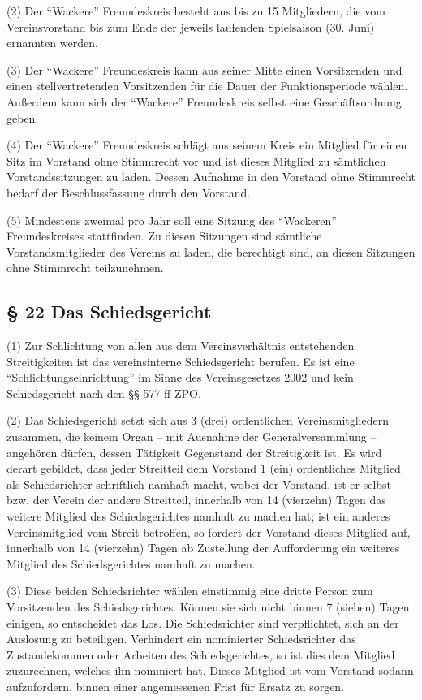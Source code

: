 \documentclass[11pt,a4paper]{article}
\begin{document}
(2)
Der "`Wackere"' Freundeskreis besteht aus bis zu 15 Mitgliedern, die vom Vereinsvorstand bis zum Ende der jeweils laufenden Spielsaison (30. Juni)
ernannten werden.

(3)
Der "`Wackere"' Freundeskreis kann aus seiner Mitte einen Vorsitzenden und einen stellvertretenden Vorsitzenden für die Dauer der Funktionsperiode wählen.
Außerdem kann sich der "`Wackere"' Freundeskreis selbst eine Geschäftsordnung geben.

(4)
Der "`Wackere"' Freundeskreis schlägt aus seinem Kreis ein Mitglied für einen Sitz im Vorstand ohne Stimmrecht vor und ist dieses Mitglied zu sämtlichen Vorstandssitzungen zu laden.
Dessen Aufnahme in den Vorstand ohne Stimmrecht bedarf der Beschlussfassung durch den Vorstand.

(5)
Mindestens zweimal pro Jahr soll eine Sitzung des "`Wackeren"' Freundeskreises stattfinden.
Zu diesen Sitzungen sind sämtliche Vorstandsmitglieder des Vereins zu laden, die berechtigt sind, an diesen Sitzungen ohne Stimmrecht teilzunehmen.

\subsection{§ 22
Das Schiedsgericht}

(1)
Zur Schlichtung von allen aus dem Vereinsverhältnis entstehenden Streitigkeiten ist das vereinsinterne Schiedsgericht berufen.
Es ist eine "`Schlichtungseinrichtung"' im Sinne des Vereinsgesetzes 2002 und kein Schiedsgericht nach den §§ 577 ff ZPO.

(2)
Das Schiedsgericht setzt sich aus 3 (drei) ordentlichen Vereinsmitgliedern zusammen, die keinem Organ – mit Ausnahme der Generalversammlung – angehören dürfen, dessen Tätigkeit Gegenstand der Streitigkeit ist.
Es wird derart gebildet, dass jeder Streitteil dem Vorstand 1 (ein) ordentliches Mitglied als Schiedsrichter schriftlich namhaft macht, wobei der Vorstand, ist er selbst bzw. der Verein der andere Streitteil, innerhalb von 14 (vierzehn) Tagen das weitere Mitglied des Schiedsgerichtes namhaft zu machen hat; ist ein anderes Vereinsmitglied vom Streit betroffen, so fordert der Vorstand dieses Mitglied auf, innerhalb von 14 (vierzehn) Tagen ab Zustellung der Aufforderung ein weiteres Mitglied des Schiedsgerichtes namhaft zu machen.

(3)
Diese beiden Schiedsrichter wählen einstimmig eine dritte Person zum Vorsitzenden des Schiedsgerichtes.
Können sie sich nicht binnen 7 (sieben)
Tagen einigen, so entscheidet das Los.
Die Schiedsrichter sind verpflichtet, sich an der Auslosung zu beteiligen.
Verhindert ein nominierter Schiedsrichter das Zustandekommen oder Arbeiten des Schiedsgerichtes, so ist dies dem Mitglied zuzurechnen, welches ihn nominiert hat.
Dieses Mitglied ist vom Vorstand sodann aufzufordern, binnen einer angemessenen Frist für Ersatz zu sorgen.
\end{document}
